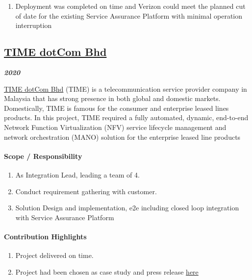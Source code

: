 \documentclass[
]{article}
\providecommand{\tightlist}{%
  \setlength{\itemsep}{0pt}\setlength{\parskip}{0pt}}
\begin{document}
\begin{enumerate}
\def\labelenumi{\arabic{enumi}.}
\tightlist
\item
  Deployment was completed on time and Verizon could meet the planned
  cut of date for the existing Service Assurance Platform with minimal
  operation interruption
\end{enumerate}

\hypertarget{time-dotcom-bhd}{%
\subsection{\texorpdfstring{\href{https://www.time.com.my/}{TIME dotCom
Bhd}}{TIME dotCom Bhd}}\label{time-dotcom-bhd}}

\textbf{\emph{2020}}

\href{https://www.time.com.my/}{TIME dotCom Bhd} (TIME) is a
telecommunication service provider company in Malaysia that has strong
presence in both global and domestic markets. Domestically, TIME is
famous for the consumer and enterprise leased lines products. In this
project, TIME required a fully automated, dynamic, end-to-end Network
Function Virtualization (NFV) service lifecycle management and network
orchestration (MANO) solution for the enterprise leased line products

\hypertarget{scope-responsibility-3}{%
\paragraph{Scope / Responsibility}\label{scope-responsibility-3}}

\begin{enumerate}
\def\labelenumi{\arabic{enumi}.}
\tightlist
\item
  As Integration Lead, leading a team of 4.
\item
  Conduct requirement gathering with customer.
\item
  Solution Design and implementation, e2e including closed loop
  integration with Service Assurance Platform
\end{enumerate}

\hypertarget{contribution-highlights-3}{%
\paragraph{Contribution Highlights}\label{contribution-highlights-3}}

\begin{enumerate}
\def\labelenumi{\arabic{enumi}.}
\tightlist
\item
  Project delivered on time.
\item
  Project had been chosen as case study and press release
  \href{https://www.ibm.com/case-studies/time-dotcom/}{here}
\end{enumerate}
\end{document}
